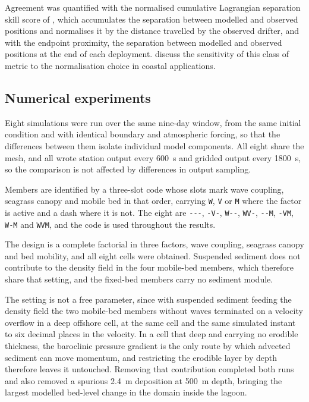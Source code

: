 Agreement was quantified with the normalised cumulative
Lagrangian separation skill score of \citet{Liu2011}, which accumulates the
separation between modelled and observed positions and normalises it by the
distance travelled by the observed drifter, and with the endpoint proximity,
the separation between modelled and observed positions at the end of each
deployment. \citet{Revelard2021} discuss the sensitivity of this class of
metric to the normalisation choice in coastal applications.

\subsection{Numerical experiments}
\label{sec:methods_experiments}

Eight simulations were run over the same nine-day window, from the same initial
condition and with identical boundary and atmospheric forcing, so that the
differences between them isolate individual model components. All eight share
the mesh, and all wrote station output every 600~s and gridded output every
1800~s, so the comparison is not affected by differences in output sampling.

Members are identified by a three-slot code whose slots mark wave coupling,
seagrass canopy and mobile bed in that order, carrying \texttt{W}, \texttt{V}
or \texttt{M} where the factor is active and a dash where it is not. The eight
are \texttt{{-}{-}{-}}, \texttt{{-}V{-}}, \texttt{W{-}{-}}, \texttt{WV{-}},
\texttt{{-}{-}M}, \texttt{{-}VM}, \texttt{W{-}M} and \texttt{WVM}, and the code
is used throughout the results.

The design is a complete factorial in three factors, wave coupling, seagrass
canopy and bed mobility, and all eight cells were obtained. Suspended sediment
does not contribute to the density field in the four mobile-bed members, which
therefore share that setting, and the fixed-bed members carry no sediment
module.

The setting is not a free parameter, since with suspended sediment feeding the
density field the two mobile-bed members without waves terminated on a
velocity overflow in a deep offshore cell, at the same cell and the same
simulated instant to six decimal places in the velocity. In a cell that deep
and carrying no erodible thickness, the baroclinic pressure gradient is the
only route by which advected sediment can move momentum, and restricting the
erodible layer by depth therefore leaves it untouched. Removing that
contribution completed both runs and also removed a spurious 2.4~m deposition
at 500~m depth, bringing the largest modelled bed-level change in the domain
inside the lagoon.

